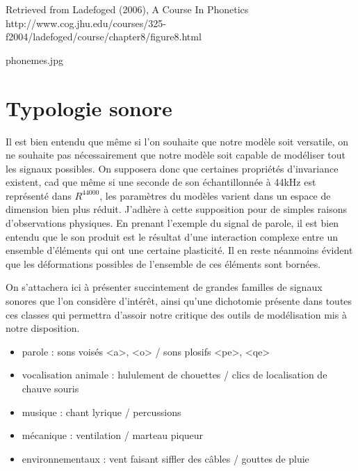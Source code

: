 Retrieved from Ladefoged (2006), A Course In Phonetics http://www.cog.jhu.edu/courses/325-f2004/ladefoged/course/chapter8/figure8.html

phonemes.jpg

\section{Typologie sonore} \label{sec:typologie}

Il est bien entendu que même si l'on souhaite que notre modèle soit versatile, on ne souhaite pas nécessairement que notre modèle soit capable de modéliser tout les signaux possibles. On supposera donc que certaines propriétés d'invariance existent, cad que même si une seconde de son échantillonnée à 44kHz est représenté dans $R^44000$, les paramètres du modèles varient dans un espace de dimension bien plus réduit. J'adhère à cette supposition pour de simples raisons d'observations physiques. En prenant l'exemple du signal de parole, il est bien entendu que le son produit est le résultat d'une interaction complexe entre un ensemble d'éléments qui ont une certaine plasticité. Il en reste néanmoins évident que les déformations possibles de l'ensemble de ces éléments sont bornées.

On s'attachera ici à présenter succintement de grandes familles de signaux sonores que l'on considère d'intérêt, ainsi qu'une dichotomie présente dans toutes ces classes qui permettra d'assoir notre critique des outils de modélisation mis à notre disposition.

\begin{itemize}
  \item parole : sons voisés <a>, <o> / sons plosifs <pe>, <qe>
  \item vocalisation animale : hululement de chouettes / clics de localisation de chauve souris
  \item musique : chant lyrique / percussions
  \item mécanique : ventilation / marteau piqueur
  \item environnementaux : vent faisant siffler des câbles / gouttes de pluie
\end{itemize}

